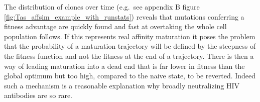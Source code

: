 The distribution of clones over time (e.g.\ see appendix B figure \ref{fig:Tas_affsim_example_with_runstats}) reveals that mutations conferring a fitness advantage are quickly found and fast at overtaking the whole cell population follows.
If this represents real affinity maturation it poses the problem that the probability of a maturation trajectory will be defined by the steepness of the fitness function and not the fitness at the end of a trajectory.
There is then a way of leading maturation into a dead end that is far lower in fitness than the global optimum but too high, compared to the naive state, to be reverted.
Indeed such a mechanism is a reasonable explanation why broadly neutralizing HIV antibodies are so rare.


